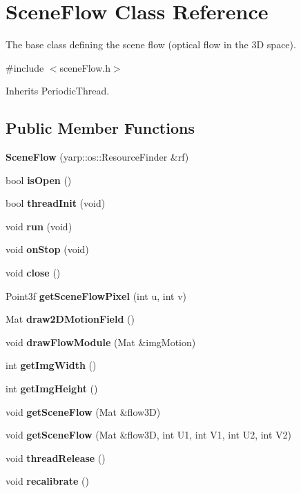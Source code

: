 \section{Scene\+Flow Class Reference}
\label{classSceneFlow}


The base class defining the scene flow (optical flow in the 3D space).  




{\ttfamily \#include $<$scene\+Flow.\+h$>$}



Inherits Periodic\+Thread.

\subsection*{Public Member Functions}
\begin{DoxyCompactItemize}
\item 
\mbox{\label{classSceneFlow_a09a89df061b9ec7a6964f7d82d8272eb}} 
{\bfseries Scene\+Flow} (yarp\+::os\+::\+Resource\+Finder \&rf)
\item 
\mbox{\label{classSceneFlow_a360b8be98c1c11f3543b6c0744f4da82}} 
bool {\bfseries is\+Open} ()
\item 
\mbox{\label{classSceneFlow_a8603d1225367313e78d74d5453afc647}} 
bool {\bfseries thread\+Init} (void)
\item 
\mbox{\label{classSceneFlow_a88ebf1f92e8d45073ac603dac1073c38}} 
void {\bfseries run} (void)
\item 
\mbox{\label{classSceneFlow_a87be5bb61cff579f919a496748d33b0b}} 
void {\bfseries on\+Stop} (void)
\item 
\mbox{\label{classSceneFlow_a3c734406548b2f720c22302ded2233cd}} 
void {\bfseries close} ()
\item 
\mbox{\label{classSceneFlow_abff8df2a30a081071c27c86c680d9c91}} 
Point3f {\bfseries get\+Scene\+Flow\+Pixel} (int u, int v)
\item 
\mbox{\label{classSceneFlow_a0aeea0c038e4b684961e87654035524c}} 
Mat {\bfseries draw2\+D\+Motion\+Field} ()
\item 
\mbox{\label{classSceneFlow_a8514161cfcf8227c695ae72fd125af86}} 
void {\bfseries draw\+Flow\+Module} (Mat \&img\+Motion)
\item 
\mbox{\label{classSceneFlow_a0844d30b0f1c10828f2144eb446e99fb}} 
int {\bfseries get\+Img\+Width} ()
\item 
\mbox{\label{classSceneFlow_a3c0fbe6df132fba94a0b24a8d1e90661}} 
int {\bfseries get\+Img\+Height} ()
\item 
\mbox{\label{classSceneFlow_a8920f6b49c46d524fa543ac1e55c18e8}} 
void {\bfseries get\+Scene\+Flow} (Mat \&flow3D)
\item 
\mbox{\label{classSceneFlow_a82e1c079533882d4662fa29853d02f76}} 
void {\bfseries get\+Scene\+Flow} (Mat \&flow3D, int U1, int V1, int U2, int V2)
\item 
\mbox{\label{classSceneFlow_a999d87ea72266a0fc258b94a95fa48ec}} 
void {\bfseries thread\+Release} ()
\item 
\mbox{\label{classSceneFlow_aecfc668fbb7d6800010abfe424a37aae}} 
void {\bfseries recalibrate} ()
\end{DoxyCompactItemize}


